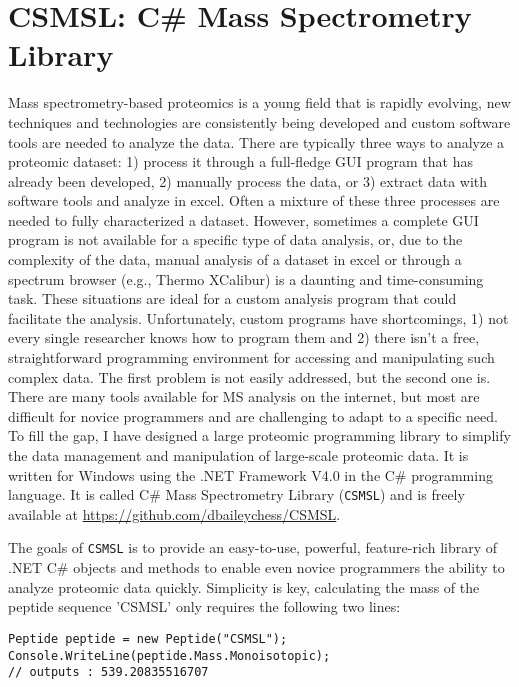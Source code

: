 \section{CSMSL: C\# Mass Spectrometry Library}
Mass spectrometry-based proteomics is a young field that is rapidly evolving, new techniques and technologies are consistently being developed and custom software tools are needed to analyze the data. There are typically three ways to analyze a proteomic dataset: 1) process it through a full-fledge GUI program that has already been developed, 2) manually process the data, or 3) extract data with software tools and analyze in excel. Often a mixture of these three processes are needed to fully characterized a dataset. However, sometimes a complete GUI program is not available for a specific type of data analysis, or, due to the complexity of the data, manual analysis of a dataset in excel or through a spectrum browser (e.g., Thermo XCalibur) is a daunting and time-consuming task. These situations are ideal for a custom analysis program that could facilitate the analysis. Unfortunately, custom programs have shortcomings, 1) not every single researcher knows how to program them and 2) there isn't a free, straightforward programming environment for accessing and manipulating such complex data. The first problem is not easily addressed, but the second one is. There are many tools available for MS analysis on the internet, but most are difficult for novice programmers and are challenging to adapt to a specific need. To fill the gap, I have designed a large proteomic programming library to simplify the data management and manipulation of large-scale proteomic data. It is written for Windows using the .NET Framework V4.0 in the C\# programming language. It is called C\# Mass Spectrometry Library (\texttt{CSMSL}) and is freely available at \url{https://github.com/dbaileychess/CSMSL}.

The goals of \texttt{CSMSL} is to provide an easy-to-use, powerful, feature-rich library of .NET C\# objects and methods to enable even novice programmers the ability to analyze proteomic data quickly. Simplicity is key, calculating the mass of the peptide sequence 'CSMSL' only requires the following two lines:

\lstset{style=sharpc}
\begin{lstlisting}
Peptide peptide = new Peptide("CSMSL");
Console.WriteLine(peptide.Mass.Monoisotopic);
// outputs : 539.20835516707
\end{lstlisting}

